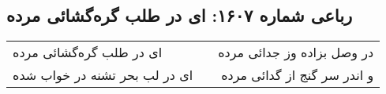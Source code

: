 \begin{center}
\section*{رباعی شماره ۱۶۰۷: ای در طلب گره‌گشائی مرده}
\label{sec:1607}
\begin{longtable}{l p{0.5cm} r}
ای در طلب گره‌گشائی مرده
&&
در وصل بزاده وز جدائی مرده
\\
ای در لب بحر تشنه در خواب شده
&&
و اندر سر گنج از گدائی مرده
\\
\end{longtable}
\end{center}
